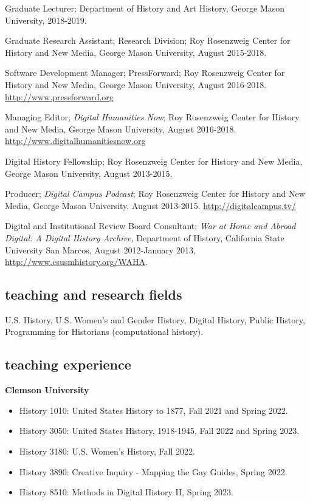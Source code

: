 \documentclass[11pt]{article}
\begin{document}
Graduate Lecturer; Department of History and Art History, George Mason University, 2018-2019.

Graduate Research Assistant; Research Division; Roy Rosenzweig Center for History and New Media, George Mason University, August 2015-2018.

Software Development Manager; PressForward; Roy Rosenzweig Center for History and New Media, George Mason University, August 2016-2018. \url{http://www.pressforward.org}

Managing Editor; \emph{Digital Humanities Now}; Roy Rosenzweig Center for History and New Media, George Mason University, August 2016-2018. \url{http://www.digitalhumanitiesnow.org}

Digital History Fellowship; Roy Rosenzweig Center for History and New Media, George Mason University, August 2013-2015.

Producer; \emph{Digital Campus Podcast}; Roy Rosenzweig Center for History and New Media, George Mason University, August 2013-2015. \url{http://digitalcampus.tv/}

Digital and Institutional Review Board Consultant; \emph{War at Home and Abroad Digital: A Digital History Archive,} Department of History, California State University San Marcos, August 2012-January 2013, \url{http://www.csusmhistory.org/WAHA}.

\subsection{teaching and research fields}
U.S. History, U.S. Women's and Gender History, Digital History, Public History, Programming for Historians (computational history).

\subsection{teaching experience}

\textbf{Clemson University}
\begin{itemize}
  \item History 1010: United States History to 1877, Fall 2021 and Spring 2022.
  \item History 3050: United States History, 1918-1945, Fall 2022 and Spring 2023.
  \item History 3180: U.S. Women's History, Fall 2022. 
  \item History 3890: Creative Inquiry - Mapping the Gay Guides, Spring 2022.
  \item History 8510: Methods in Digital History II, Spring 2023.
\end{itemize}
 
\end{document}
